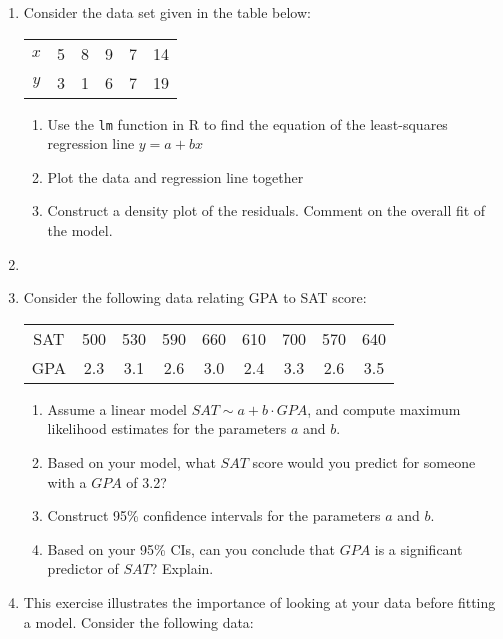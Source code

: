 \documentclass[10pt]{article}
\begin{document}
\begin{enumerate}

\item Consider the data set given in the table below:

  \begin{table}[h!]
    \centering
    \begin{tabular}{cccccc}
      \hline
      $x$ & 5 & 8 & 9 & 7 & 14\\
      $y$ & 3 & 1 & 6 & 7 & 19\\
      \hline
    \end{tabular}
  \end{table}
  \begin{enumerate}
  \item Use the \verb|lm| function in R to find the equation of the least-squares regression line $y=a+bx$
  \item Plot the data and regression line together
    \item Construct a density plot of the residuals.  Comment on the overall fit of the model.
  \end{enumerate}


\item   

\item Consider the following data relating GPA to SAT score:
\begin{table}[h!]
    \centering
    \begin{tabular}{ccccccccc}
      \hline
      SAT & 500 & 530 & 590 & 660 & 610 & 700 & 570 & 640\\
      GPA & 2.3 & 3.1 & 2.6 & 3.0 & 2.4 & 3.3 & 2.6 & 3.5\\
      \hline
    \end{tabular}
  \end{table}
  \begin{enumerate}
  \item Assume a linear model $SAT \sim a+b\cdot GPA$, and compute maximum likelihood estimates for the parameters $a$ and $b$.
  \item Based on your model, what $SAT$ score would you predict for someone with a $GPA$ of 3.2?
  \item Construct 95\% confidence intervals for the parameters $a$ and $b$.
    \item Based on your 95\% CIs, can you conclude that $GPA$ is a significant predictor of $SAT$?  Explain.
  \end{enumerate}
  

\item This exercise illustrates the importance of looking at your data before fitting a model.  Consider the following data:


\end{enumerate}
\end{document}
